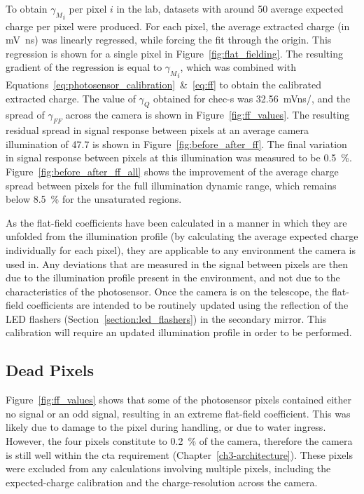 To obtain ${\gamma_M}_i$ per pixel $i$ in the lab, datasets with around \SI{50}{\pe} average expected charge per pixel were produced. For each pixel, the average extracted charge (in \si{mV ns}) was linearly regressed, while forcing the fit through the origin. This regression is shown for a single pixel in Figure~\ref{fig:flat_fielding}. The resulting gradient of the regression is equal to ${\gamma_M}_i$, which was combined with Equations~\ref{eq:photosensor_calibration}~\&~\ref{eq:ff} to obtain the calibrated extracted charge. The value of $\gamma_Q$ obtained for \gls{chec-s} was \SI{32.56}{mVns/\pe}, and the spread of $\gamma_{FF}$ across the camera is shown in Figure~\ref{fig:ff_values}. The resulting residual spread in signal response between pixels at an average camera illumination of \SI{47.7}{\pe} is shown in Figure~\ref{fig:before_after_ff}. The final variation in signal response between pixels at this illumination was measured to be \SI{0.5}{\percent}. Figure~\ref{fig:before_after_ff_all} shows the improvement of the average charge spread between pixels for the full illumination dynamic range, which remains below \SI{8.5}{\percent} for the unsaturated regions.

As the flat-field coefficients have been calculated in a manner in which they are unfolded from the illumination profile (by calculating the average expected charge individually for each pixel), they are applicable to any environment the camera is used in. Any deviations that are measured in the signal between pixels are then due to the illumination profile present in the environment, and not due to the characteristics of the photosensor. Once the camera is on the telescope, the flat-field coefficients are intended to be routinely updated using the reflection of the LED flashers (Section~\ref{section:led_flashers}) in the secondary mirror. This calibration will require an updated illumination profile in order to be performed.

\subsection{Dead Pixels}

Figure~\ref{fig:ff_values} shows that some of the photosensor pixels contained either no signal or an odd signal, resulting in an extreme flat-field coefficient. This was likely due to damage to the pixel during handling, or due to water ingress. However, the four pixels constitute to \SI{0.2}{\percent} of the camera, therefore the camera is still well within the  \gls{cta} requirement (Chapter~\ref{ch3-architecture}). These pixels were excluded from any calculations involving multiple pixels, including the expected-charge calibration and the charge-resolution across the camera. 

